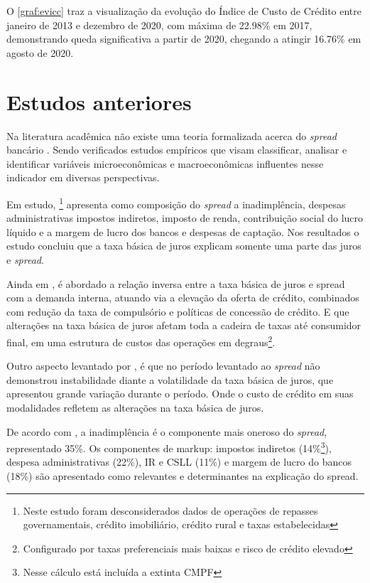 \documentclass[
  12pt,
  12pt,
  openright,
  oneside,
  a4paper,
  chapter=TITLE,
  section=TITLE,
  subsection=TITLE,
  subsubsection=TITLE,
  english,
  portugues,
  sumario=tradicional]{abntex2}
\begin{document}
O \autoref{graf:evicc} traz a visualização da evolução do Índice de Custo de Crédito entre janeiro de 2013 e dezembro de 2020, com máxima de 22.98\% em 2017, demonstrando queda significativa a partir de 2020, chegando a atingir 16.76\% em agosto de 2020.

\section{Estudos anteriores}

Na literatura acadêmica não existe uma teoria formalizada acerca do \emph{spread} bancário \cite{timotio:2018}. Sendo verificados estudos empíricos que visam classificar, analisar e identificar variáveis microeconômicas e macroeconômicas influentes nesse indicador em diversas perspectivas.

Em estudo, \textcite{BCB:1999}\footnote{Neste estudo foram desconsiderados dados de operações de repasses governamentais, crédito imobiliário, crédito rural e taxas estabelecidas} apresenta como composição do \emph{spread} a inadimplência, despesas administrativas impostos indiretos, imposto de renda, contribuição social do lucro líquido e a margem de lucro dos bancos e despesas de captação. Nos resultados o estudo concluiu que a taxa básica de juros explicam somente uma parte das juros e \emph{spread}.

Ainda em \textcite{BCB:1999}, é abordado a relação inversa entre a taxa básica de juros e spread com a demanda interna, atuando via a elevação da oferta de crédito, combinados com redução da taxa de compulsório e políticas de concessão de crédito. E que alterações na taxa básica de juros afetam toda a cadeira de taxas até consumidor final, em uma estrutura de custos das operações em degraus\footnote{Configurado por taxas preferenciais mais baixas e risco de crédito elevado}.

Outro aspecto levantado por \textcite{BCB:1999}, é que no período levantado ao \emph{spread} não demonstrou instabilidade diante a volatilidade da taxa básica de juros, que apresentou grande variação durante o período. Onde o custo de crédito em suas modalidades refletem as alterações na taxa básica de juros.

De acordo com \textcite{BCB:1999}, a inadimplência é o componente mais oneroso do \emph{spread}, representado 35\%. Os componentes de markup: impostos indiretos (14\%\footnote{Nesse cálculo está incluída a extinta CMPF}), despesa administrativas (22\%), IR e CSLL (11\%) e margem de lucro do bancos (18\%) são apresentado como relevantes e determinantes na explicação do spread.
\end{document}
